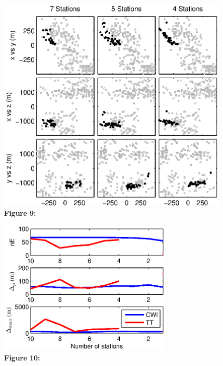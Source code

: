 \documentclass[12pt,double]{article}
\begin{document}
\noindent\includegraphics[height = 25pc]{Figure9_bw.eps} \\
\textbf{Figure 9:} 


\clearpage
\noindent\includegraphics[width=20pc]{Figure10_c.eps} \\
\textbf{Figure 10:} 
\end{document}

